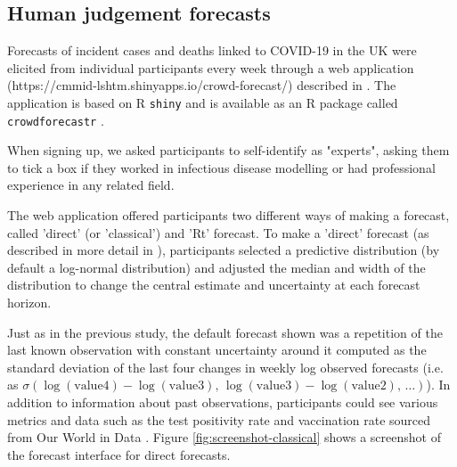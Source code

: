 \documentclass[10pt,a4paper,twocolumn]{article}
\begin{document}
\subsection*{Human judgement forecasts}

Forecasts of incident cases and deaths linked to COVID-19 in the UK were elicited from individual participants every week through a web application (https://cmmid-lshtm.shinyapps.io/crowd-forecast/) described in \cite{bosseComparingHumanModelbased2022}. The application is based on \textsf{R} \cite{R} \texttt{shiny} \cite{shiny} and is available as an \textsf{R} package called \texttt{crowdforecastr} \citep{crowdforecastr}. 

When signing up, we asked participants to self-identify as "experts", asking them to tick a box if they worked in infectious disease modelling or had professional experience in any related field. 

The web application offered participants two different ways of making a forecast, called 'direct' (or 'classical') and 'Rt' forecast. To make a 'direct' forecast (as described in more detail in \cite{bosseComparingHumanModelbased2022}), participants selected a predictive distribution (by default a log-normal distribution) and adjusted the median and width of the distribution to change the central estimate and uncertainty at each forecast horizon. 

Just as in the previous study, the default forecast shown was a repetition of the last known observation with constant uncertainty around it computed as the standard deviation of the last four changes in weekly log observed forecasts (i.e. as $\sigma(\log(\text{value4}) - \log(\text{value3}), \, \log(\text{value3}) - \log(\text{value2}), \, \dots)$).
In addition to information about past observations, participants could see various metrics and data such as the test positivity rate and vaccination rate sourced from Our World in Data \citep{owidcoronavirus}. Figure \ref{fig:screenshot-classical} shows a screenshot of the forecast interface for direct forecasts. 
\end{document}
